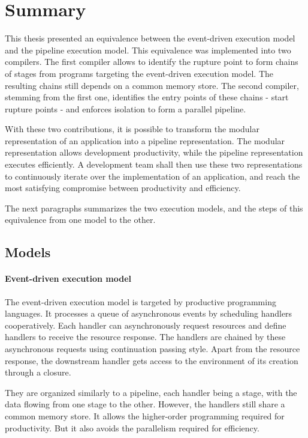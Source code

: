 \section{Summary} \label{chapter6:summary}

This thesis presented an equivalence between the event-driven execution model and the pipeline execution model.
This equivalence was implemented into two compilers.
The first compiler allows to identify the rupture point to form chains of stages from programs targeting the event-driven execution model.
The resulting chains still depends on a common memory store.
The second compiler, stemming from the first one, identifies the entry points of these chains - start rupture points - and enforces isolation to form a parallel pipeline.

With these two contributions, it is possible to transform the modular representation of an application into a pipeline representation.
The modular representation allows development productivity, while the pipeline representation executes efficiently.
A development team shall then use these two representations to continuously iterate over the implementation of an application, and reach the most satisfying compromise between productivity and efficiency.

The next paragraphs summarizes the two execution models, and the steps of this equivalence from one model to the other.

\subsection{Models} \label{chapter7:summary:model}

\paragraph{Event-driven execution model}

The event-driven execution model is targeted by productive programming languages.
It processes a queue of asynchronous events by scheduling handlers cooperatively.
Each handler can asynchronously request resources and define handlers to receive the resource response. 
The handlers are chained by these asynchronous requests using continuation passing style.
Apart from the resource response, the downstream handler gets access to the environment of its creation through a closure.

They are organized similarly to a pipeline, each handler being a stage, with the data flowing from one stage to the other.
However, the handlers still share a common memory store.
It allows the higher-order programming required for productivity.
But it also avoids the parallelism required for efficiency.

